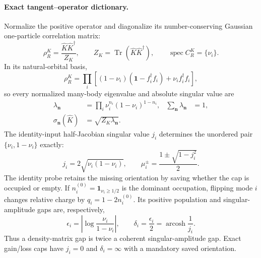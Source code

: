 \documentclass[aps,prx,twocolumn,floatfix,nofootinbib,superscriptaddress,longbibliography]{revtex4-2}
\begin{document}
\paragraph*{Exact tangent--operator dictionary.}
Normalize the positive operator and diagonalize its number-conserving Gaussian
one-particle correlation matrix:
\begin{equation}
 \rho_R^K=\frac{\widehat K\widehat K^\dagger}{Z_K},\qquad
 Z_K=\operatorname{Tr}(\widehat K\widehat K^\dagger),\qquad
 \operatorname{spec} C_R^K=\{\nu_i\}.
 \label{eq:G5-rho-definition}
\end{equation}
In its natural-orbital basis,
\begin{equation}
 \rho_R^K=\prod_i\left[(1-\nu_i)(\mathbf{1}-f_i^\dagger f_i)
                  +\nu_i f_i^\dagger f_i\right],
 \label{eq:G5-gaussian-factorization}
\end{equation}
so every normalized many-body eigenvalue and absolute singular value are
\begin{align}
 \lambda_{\boldsymbol n}
 &=\prod_i\nu_i^{n_i}(1-\nu_i)^{1-n_i},
 &\sum_{\boldsymbol n}\lambda_{\boldsymbol n}&=1,\label{eq:G5-binary-products}\\
 \sigma_{\boldsymbol n}(\widehat K)
 &=\sqrt{Z_K\lambda_{\boldsymbol n}}.
 \label{eq:G5-absolute-singular-values}
\end{align}
The identity-input half-Jacobian singular value $j_i$ determines the unordered pair
$\{\nu_i,1-\nu_i\}$ exactly:
\begin{equation}
 j_i=2\sqrt{\nu_i(1-\nu_i)},\qquad
 \mu_i^\pm=\frac{1\pm\sqrt{1-j_i^2}}{2}.
 \label{eq:G5-tangent-dictionary}
\end{equation}
The identity probe retains the missing orientation by saving whether the cap is occupied
or empty.  If $n_i^{(0)}=\mathbf{1}_{\nu_i\geq1/2}$ is the dominant occupation, flipping
mode $i$ changes relative charge by $q_i=1-2n_i^{(0)}$.  Its positive population and
singular-amplitude gaps are, respectively,
\begin{equation}
 \epsilon_i=\left|\log\frac{\nu_i}{1-\nu_i}\right|,
 \qquad
 \delta_i=\frac{\epsilon_i}{2}=\operatorname{arcosh}\frac{1}{j_i}.
 \label{eq:G5-radial-gaps}
\end{equation}
Thus a density-matrix gap is twice a coherent singular-amplitude gap.  Exact gain/loss
caps have $j_i=0$ and $\delta_i=\infty$ with a mandatory saved orientation.
\end{document}
